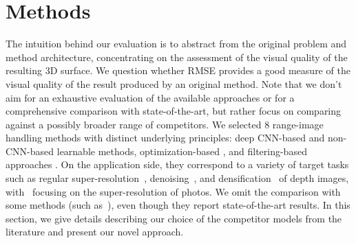 \section{Methods}
\label{sec:_methods}


The  intuition behind our evaluation is to abstract from the original problem and method architecture, concentrating on the assessment of the visual quality of the resulting 3D surface. We question whether RMSE provides a good measure of the visual quality of the result produced by an original method. 
Note that we don't aim for an exhaustive evaluation of the available approaches or for a comprehensive comparison with state-of-the-art, but rather focus on comparing against a possibly broader range of competitors. 
We selected 8 range-image handling methods with distinct underlying principles: deep CNN-based \cite{riegler2016deep,hui2016depth,mal2018sparse,yan2018ddrnet,Ulyanov_2018_CVPR} 
and non-CNN-based \cite{gu2017learning} learnable methods,
optimization-based \cite{haefner2018fight},
and filtering-based approaches \cite{xie2016edge}. 
On the application side, they correspond to a variety of target tasks 
such as regular super-resolution~\cite{riegler2016deep,hui2016depth,haefner2018fight,xie2016edge},
denoising~\cite{yan2018ddrnet,gu2017learning}, and 
densification~\cite{mal2018sparse} of depth images, with~\cite{Ulyanov_2018_CVPR} focusing on the super-resolution of photos. 
We omit the comparison with some methods (such as~\cite{zhang2018image}), even though they report state-of-the-art results. 
In this section, we give details describing our choice of the competitor models from the literature and present our novel approach.

